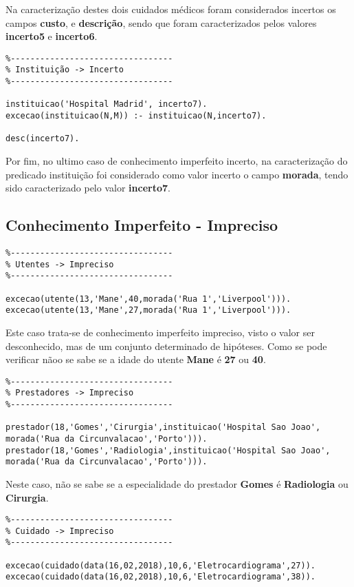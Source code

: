 \documentclass{report}
\begin{document}
Na caracterização destes dois cuidados médicos foram considerados incertos os campos \textbf{custo}, e \textbf{descrição}, sendo que foram caracterizados pelos valores \textbf{incerto5} e \textbf{incerto6}.

\begin{verbatim}
%---------------------------------
% Instituição -> Incerto
%---------------------------------

instituicao('Hospital Madrid', incerto7).
excecao(instituicao(N,M)) :- instituicao(N,incerto7).

desc(incerto7).
\end{verbatim}

Por fim, no ultimo caso de conhecimento imperfeito incerto, na caracterização do predicado instituição foi considerado como valor incerto o campo \textbf{morada}, tendo sido caracterizado pelo valor \textbf{incerto7}.


\subsection{Conhecimento Imperfeito - Impreciso}

\begin{verbatim}
%---------------------------------
% Utentes -> Impreciso
%---------------------------------

excecao(utente(13,'Mane',40,morada('Rua 1','Liverpool'))).
excecao(utente(13,'Mane',27,morada('Rua 1','Liverpool'))).
\end{verbatim}

Este caso trata-se de conhecimento imperfeito impreciso, visto o valor ser desconhecido, mas de um conjunto determinado de hipóteses. Como se pode verificar nãoo se sabe se a idade do utente \textbf{Mane} é \textbf{27} ou \textbf{40}.

\begin{verbatim}
%---------------------------------
% Prestadores -> Impreciso
%---------------------------------

prestador(18,'Gomes','Cirurgia',instituicao('Hospital Sao Joao', morada('Rua da Circunvalacao','Porto'))).
prestador(18,'Gomes','Radiologia',instituicao('Hospital Sao Joao', morada('Rua da Circunvalacao','Porto'))).
\end{verbatim}

Neste caso, não se sabe se a especialidade do prestador \textbf{Gomes} é \textbf{Radiologia} ou \textbf{Cirurgia}.

\begin{verbatim}
%---------------------------------
% Cuidado -> Impreciso
%---------------------------------

excecao(cuidado(data(16,02,2018),10,6,'Eletrocardiograma',27)).
excecao(cuidado(data(16,02,2018),10,6,'Eletrocardiograma',38)).
\end{verbatim}
\end{document}
